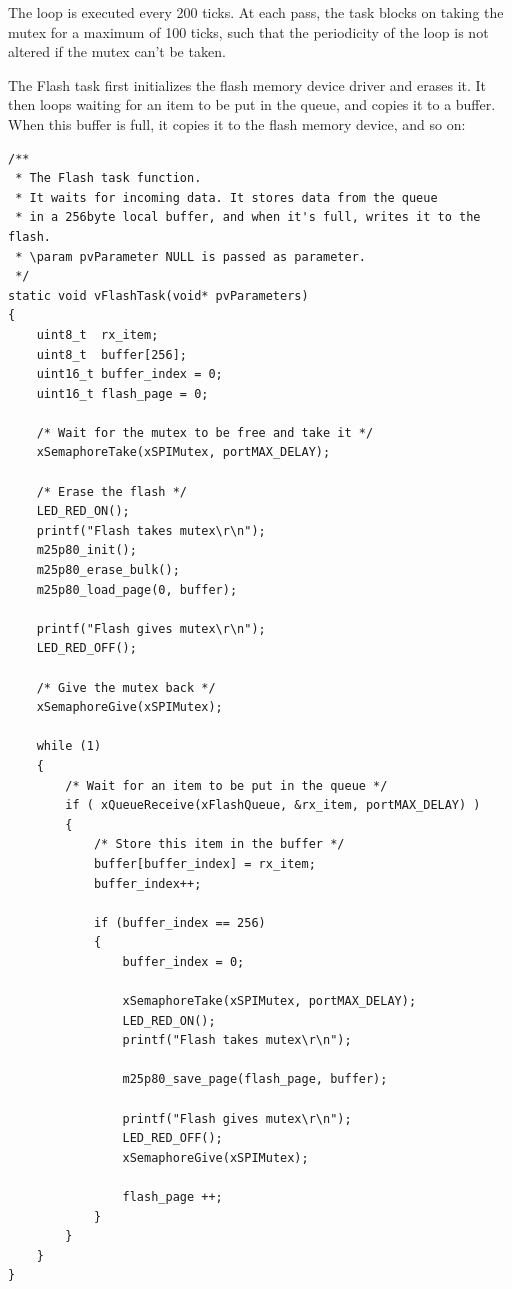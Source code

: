 \documentclass[11pt]{report}
\begin{document}
The loop is executed every 200 ticks. At each pass, the task blocks on taking the mutex for a maximum of 100 ticks, such that the periodicity of the loop is not altered if the mutex can't be taken.

The Flash task first initializes the flash memory device driver and erases it.
It then loops waiting for an item to be put in the queue, and copies it to a buffer. When this buffer is full, it copies it to the flash memory device, and so on:

\begin{verbatim}
/**
 * The Flash task function.
 * It waits for incoming data. It stores data from the queue 
 * in a 256byte local buffer, and when it's full, writes it to the flash.
 * \param pvParameter NULL is passed as parameter.
 */
static void vFlashTask(void* pvParameters)
{
    uint8_t  rx_item;
    uint8_t  buffer[256];
    uint16_t buffer_index = 0;
    uint16_t flash_page = 0;
    
    /* Wait for the mutex to be free and take it */
    xSemaphoreTake(xSPIMutex, portMAX_DELAY);
    
    /* Erase the flash */
    LED_RED_ON();
    printf("Flash takes mutex\r\n");
    m25p80_init();
    m25p80_erase_bulk();
    m25p80_load_page(0, buffer);
    
    printf("Flash gives mutex\r\n");
    LED_RED_OFF();
    
    /* Give the mutex back */
    xSemaphoreGive(xSPIMutex);
    
    while (1)
    {
        /* Wait for an item to be put in the queue */
        if ( xQueueReceive(xFlashQueue, &rx_item, portMAX_DELAY) )
        {
            /* Store this item in the buffer */
            buffer[buffer_index] = rx_item;
            buffer_index++;
            
            if (buffer_index == 256)
            {
                buffer_index = 0;
                
                xSemaphoreTake(xSPIMutex, portMAX_DELAY);
                LED_RED_ON();
                printf("Flash takes mutex\r\n");
                
                m25p80_save_page(flash_page, buffer);
                
                printf("Flash gives mutex\r\n");
                LED_RED_OFF();
                xSemaphoreGive(xSPIMutex);
                
                flash_page ++;
            }
        }
    }
}
\end{verbatim}
\end{document}
